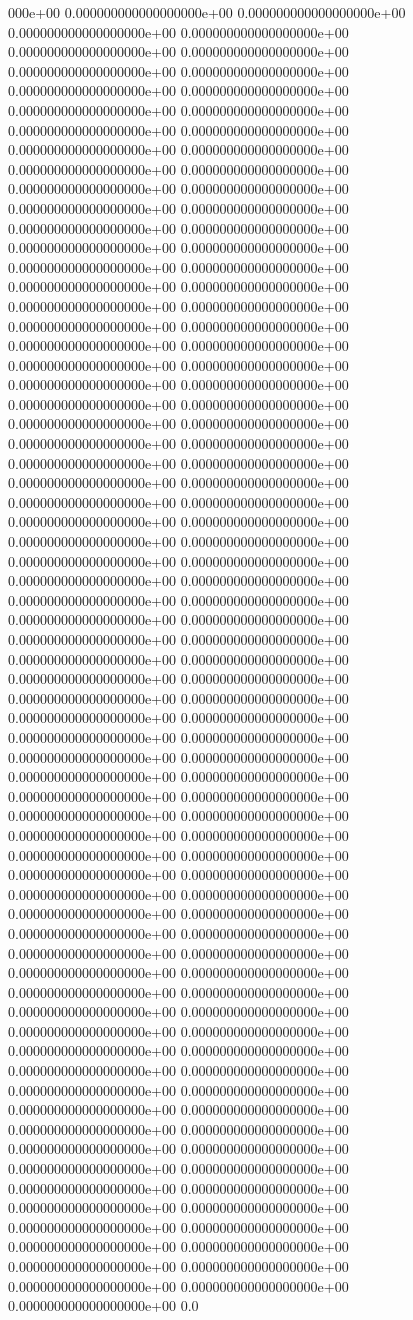 000e+00	0.000000000000000000e+00	0.000000000000000000e+00	0.000000000000000000e+00	0.000000000000000000e+00	0.000000000000000000e+00	0.000000000000000000e+00	0.000000000000000000e+00	0.000000000000000000e+00	0.000000000000000000e+00	0.000000000000000000e+00	0.000000000000000000e+00	0.000000000000000000e+00	0.000000000000000000e+00	0.000000000000000000e+00	0.000000000000000000e+00	0.000000000000000000e+00	0.000000000000000000e+00	0.000000000000000000e+00	0.000000000000000000e+00	0.000000000000000000e+00	0.000000000000000000e+00	0.000000000000000000e+00	0.000000000000000000e+00	0.000000000000000000e+00	0.000000000000000000e+00	0.000000000000000000e+00	0.000000000000000000e+00	0.000000000000000000e+00	0.000000000000000000e+00	0.000000000000000000e+00	0.000000000000000000e+00	0.000000000000000000e+00	0.000000000000000000e+00	0.000000000000000000e+00	0.000000000000000000e+00	0.000000000000000000e+00	0.000000000000000000e+00	0.000000000000000000e+00	0.000000000000000000e+00	0.000000000000000000e+00	0.000000000000000000e+00	0.000000000000000000e+00	0.000000000000000000e+00	0.000000000000000000e+00	0.000000000000000000e+00	0.000000000000000000e+00	0.000000000000000000e+00	0.000000000000000000e+00	0.000000000000000000e+00	0.000000000000000000e+00	0.000000000000000000e+00	0.000000000000000000e+00	0.000000000000000000e+00	0.000000000000000000e+00	0.000000000000000000e+00	0.000000000000000000e+00	0.000000000000000000e+00	0.000000000000000000e+00	0.000000000000000000e+00	0.000000000000000000e+00	0.000000000000000000e+00	0.000000000000000000e+00	0.000000000000000000e+00	0.000000000000000000e+00	0.000000000000000000e+00	0.000000000000000000e+00	0.000000000000000000e+00	0.000000000000000000e+00	0.000000000000000000e+00	0.000000000000000000e+00	0.000000000000000000e+00	0.000000000000000000e+00	0.000000000000000000e+00	0.000000000000000000e+00	0.000000000000000000e+00	0.000000000000000000e+00	0.000000000000000000e+00	0.000000000000000000e+00	0.000000000000000000e+00	0.000000000000000000e+00	0.000000000000000000e+00	0.000000000000000000e+00	0.000000000000000000e+00	0.000000000000000000e+00	0.000000000000000000e+00	0.000000000000000000e+00	0.000000000000000000e+00	0.000000000000000000e+00	0.000000000000000000e+00	0.000000000000000000e+00	0.000000000000000000e+00	0.000000000000000000e+00	0.000000000000000000e+00	0.000000000000000000e+00	0.000000000000000000e+00	0.000000000000000000e+00	0.000000000000000000e+00	0.000000000000000000e+00	0.000000000000000000e+00	0.000000000000000000e+00	0.000000000000000000e+00	0.000000000000000000e+00	0.000000000000000000e+00	0.000000000000000000e+00	0.000000000000000000e+00	0.000000000000000000e+00	0.000000000000000000e+00	0.000000000000000000e+00	0.000000000000000000e+00	0.000000000000000000e+00	0.000000000000000000e+00	0.000000000000000000e+00	0.000000000000000000e+00	0.000000000000000000e+00	0.000000000000000000e+00	0.000000000000000000e+00	0.000000000000000000e+00	0.000000000000000000e+00	0.000000000000000000e+00	0.000000000000000000e+00	0.000000000000000000e+00	0.000000000000000000e+00	0.000000000000000000e+00	0.000000000000000000e+00	0.000000000000000000e+00	0.000000000000000000e+00	0.000000000000000000e+00	0.000000000000000000e+00	0.000000000000000000e+00	0.000000000000000000e+00	0.000000000000000000e+00	0.000000000000000000e+00	0.000000000000000000e+00	0.0